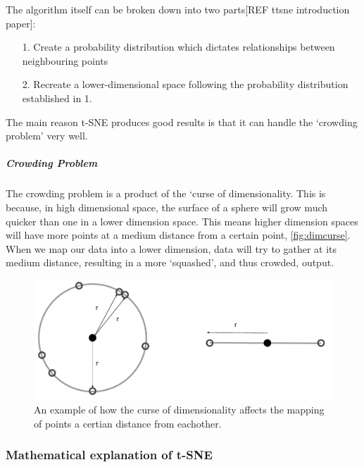 The algorithm itself can be broken down into two parts[REF ttsne introduction paper]:
\begin{itemize}
  \item [1.] Create a probability distribution which dictates relationships between neighbouring points
  \item [2.] Recreate a lower-dimensional space following the probability distribution established in 1.
\end{itemize}

The main reason t-SNE produces good results is that it can handle the `crowding problem' very well.


\subparagraph{Crowding Problem}\label{sec:overcrowd}
The crowding problem is a product of the `curse of dimensionality. This is because, in high dimensional space, the surface of a sphere will grow much quicker than one in a lower dimension space. This means higher dimension spaces will have more points at a medium distance from a certain point, \autoref{fig:dimcurse}. When we map our data into a lower dimension, data will try to gather at its medium distance, resulting in a more `squashed', and thus crowded, output.



\begin{figure}[H]
  \centering
\includegraphics[width=.5\textwidth]{4fig/dimcurse.pdf}
\caption{An example of how the curse of dimensionality affects the mapping of points a certian distance from eachother. }\label{fig:dimcurse}
\end{figure}




\subsubsection{Mathematical explanation of t-SNE}

%

